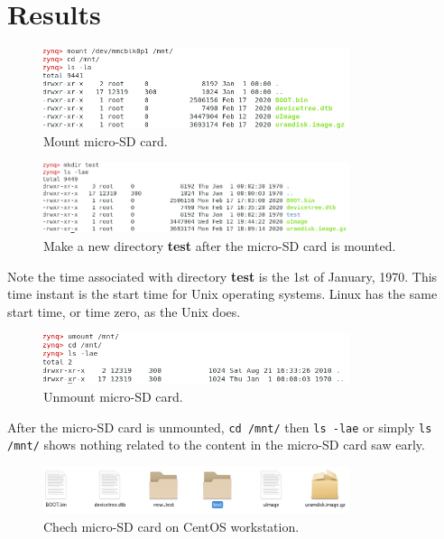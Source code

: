 \documentclass[11pt,letterpaper,titlepage]{article}
\begin{document}
\newpage

\part{Results}

\begin{figure}[ht]
    \centering
    \includegraphics[width=0.8\textwidth]{1.Load_Micro_SD_Card.png}
    \caption{Mount micro-SD card.}
\end{figure}

\begin{figure}[ht]
    \centering
    \includegraphics[width=0.8\textwidth]{2.Make_New_Dir.png}
    \caption{Make a new directory \textbf{test} after the micro-SD card is mounted.}
\end{figure}

Note the time associated with directory \textbf{test} is the 1st of January, 1970. This time instant is the start time for Unix operating systems. Linux has the same start time, or time zero, as the Unix does.

\begin{figure}[ht]
    \centering
    \includegraphics[width=0.8\textwidth]{3.Unmount_Micro_SD_Card.png}
    \caption{Unmount micro-SD card.}
\end{figure}

After the micro-SD card is unmounted, \verb|cd /mnt/| then \verb|ls -lae| or simply \verb|ls /mnt/| shows nothing related to the content in the micro-SD card saw early.

\begin{figure}[h!]
    \centering
    \includegraphics[width=0.8\textwidth]{4.Check_New_Dir.png}
    \caption{Chech micro-SD card on CentOS workstation.}
\end{figure}
\end{document}
